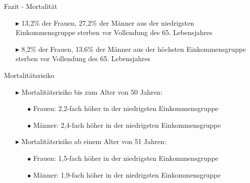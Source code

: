 \documentclass{beamer}
\begin{document}
\begin{frame}{Fazit - Mortalität}
	\begin{block}{}
		\begin{itemize}
			\item[$\blacktriangleright$] 13,2\% der Frauen, 27,2\% der Männer aus der niedrigsten Einkommensgruppe sterben vor Vollendung des 65. Lebensjahres
			\item[$\blacktriangleright$] 8,2\% der Frauen, 13,6\% der Männer aus der höchsten Einkommensgruppe sterben vor Vollendung des 65. Lebensjahres
		\end{itemize}
	\end{block}
	\pause
	\begin{block}{Mortalitätsrisiko}
		\begin{itemize}
			\item[$\blacktriangleright$] Mortalitätsrisiko bis zum Alter von 50 Jahren:
			\begin{itemize}
				\item[$\bullet$] Frauen: 2,2-fach höher in der niedrigsten Einkommensgruppe
				\item[$\bullet$] Männer: 2,4-fach höher in der niedrigsten Einkommensgruppe
			\end{itemize}
			\item[$\blacktriangleright$] Mortalitätsrisiko ab einem Alter von 51 Jahren:
			\begin{itemize}
				\item[$\bullet$] Frauen: 1,5-fach höher in der niedrigsten Einkommensgruppe
				\item[$\bullet$] Männer: 1,9-fach höher in der niedrigsten Einkommensgruppe
			\end{itemize}
		\end{itemize}
	\end{block}
\end{frame}
\end{document}
